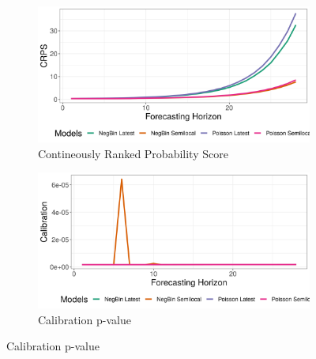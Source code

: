 \begin{figure}[H]
\begin{subfigure}{0.5\textwidth}
  \centering
  \includegraphics[width=\linewidth]{../output/Kalunguta_crps.png}  
  \caption{Contineously Ranked Probability Score}
  \label{Kalunguta_scores_1}
\end{subfigure}
\begin{subfigure}{0.5\textwidth}
  \centering
  \includegraphics[width=\linewidth]{../output/Kalunguta_calibration.png}  
  \caption{Calibration p-value}
  \label{Kalunguta_scores_2}
\end{subfigure}


\end{figure}
